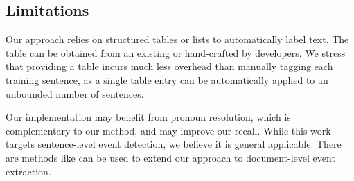 %

\subsection{Limitations}
Our approach relies on structured tables or lists to automatically label text. The table can be obtained from an existing \KB or
hand-crafted by developers. We stress that providing a table incurs much less overhead than manually tagging each training sentence, as a
single table entry can be automatically applied to an unbounded number of sentences.



Our implementation may benefit from pronoun resolution, %
which is complementary to our method, and may improve our recall. 
While this work targets sentence-level event detection, we believe it is general applicable. There are methods
like \FIXME{\cite{}} can be used to extend our approach to document-level event extraction.

